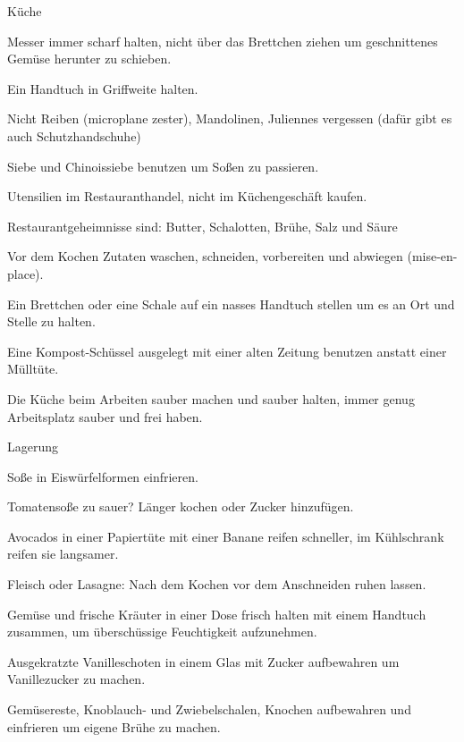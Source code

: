 Küche
\begin{compactitem}
\item Messer immer scharf halten, nicht über das Brettchen ziehen um geschnittenes Gemüse herunter zu schieben.
\item Ein Handtuch in Griffweite halten.
\item Nicht Reiben (microplane zester), Mandolinen, Juliennes vergessen (dafür gibt es auch Schutzhandschuhe)
\item Siebe und Chinoissiebe benutzen um Soßen zu passieren.
\item Utensilien im Restauranthandel, nicht im Küchengeschäft kaufen.
\item Restaurantgeheimnisse sind: Butter, Schalotten, Brühe, Salz und Säure
\item Vor dem Kochen Zutaten waschen, schneiden, vorbereiten und abwiegen (mise-en-place).
\item Ein Brettchen oder eine Schale auf ein nasses Handtuch stellen um es an Ort und Stelle zu halten.
\item Eine Kompost-Schüssel ausgelegt mit einer alten Zeitung benutzen anstatt einer Mülltüte.
\item Die Küche beim Arbeiten sauber machen und sauber halten, immer genug Arbeitsplatz sauber und frei haben.
\end{compactitem}

Lagerung
\begin{compactitem}
\item Soße in Eiswürfelformen einfrieren.
\item Tomatensoße zu sauer? Länger kochen oder Zucker hinzufügen.
\item Avocados in einer Papiertüte mit einer Banane reifen schneller, im Kühlschrank reifen sie langsamer.
\item Fleisch oder Lasagne: Nach dem Kochen vor dem Anschneiden ruhen lassen.
\item Gemüse und frische Kräuter in einer Dose frisch halten mit einem Handtuch zusammen, um überschüssige Feuchtigkeit aufzunehmen.
\item Ausgekratzte Vanilleschoten in einem Glas mit Zucker aufbewahren um Vanillezucker zu machen.
\item Gemüsereste, Knoblauch- und Zwiebelschalen, Knochen aufbewahren und einfrieren um eigene Brühe zu machen.
\end{compactitem}

